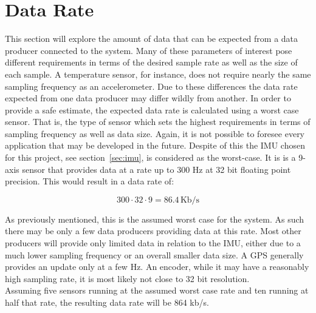 
\section{Data Rate}\label{sec:data_rate}
This section will explore the amount of data that can be expected from a data producer connected to the system.
Many of these parameters of interest pose different requirements in terms of the desired sample rate as well as the size of each sample.
A temperature sensor, for instance, does not require nearly the same sampling frequency as an accelerometer.
Due to these differences the data rate expected from one data producer may differ wildly from another.
In order to provide a safe estimate, the expected data rate is calculated using a worst case sensor.
That is, the type of sensor which sets the highest requirements in terms of sampling frequency as well as data size.
Again, it is not possible to foresee every application that may be developed in the future.
Despite of this the IMU chosen for this project, see section~\ref{sec:imu}, is considered as the worst-case.
It is is a 9-axis sensor that provides data at a rate up to 300 Hz at 32 bit floating point precision.
This would result in a data rate of:

$$300\cdot32\cdot9=86.4\,\text{Kb/s}$$

As previously mentioned, this is the assumed worst case for the system.
As such there may be only a few data producers providing data at this rate.
Most other producers will provide only limited data in relation to the IMU, either due to a much lower sampling frequency or an overall smaller data size.
A GPS generally provides an update only at a few \si{\hertz}. 
An encoder, while it may have a reasonably high sampling rate, it is most likely not close to 32 bit resolution.\\

Assuming five sensors running at the assumed worst case rate and ten running at half that rate, the resulting data rate will be 864 kb/s.
